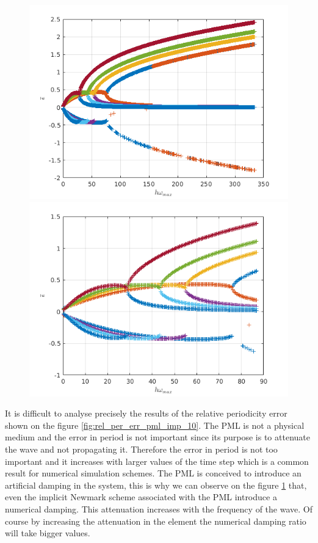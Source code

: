 \begin{itemize}
\begin{figure}[H]
\centering
\begin{minipage}{.5\textwidth}
  \centering
  \includegraphics[width=1.\linewidth]{images/num_damp_pml_imp_10.png}
\end{minipage}%
\begin{minipage}{.5\textwidth}
  \centering
  \includegraphics[width=1.\linewidth]{images/num_damp_pml_imp_10_80.png}
\end{minipage}
\label{fig:num_damp_pml_imp_10}
\end{figure} 
It is difficult to analyse precisely the results of the relative periodicity error shown on the figure \ref{fig:rel_per_err_pml_imp_10}. The PML is not a physical medium and the error in period is not important since its purpose is to attenuate the wave and not propagating it. Therefore the error in period is not too important and it increases with larger values of the time step which is a common result for numerical simulation schemes. The PML is conceived to introduce an artificial damping in the system, this is why we can observe on the figure \ref{fig:num_damp_pml_imp_10} that, even the implicit Newmark scheme associated with the PML introduce a numerical damping. This attenuation increases with the frequency of the wave. Of course by increasing the attenuation in the element the numerical damping ratio will take bigger values.

\end{itemize}

